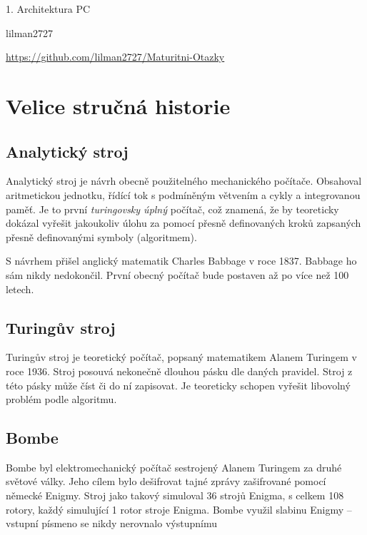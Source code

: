 \documentclass[a4paper]{article}
\begin{document}
\thispagestyle{empty}
\begin{center}
    \vspace*{5cm}
    {\huge{1. Architektura PC}} \par
    \vspace{15cm}
    {\large{lilman2727}} \par
    \vspace{3cm}
    {\url{https://github.com/lilman2727/Maturitni-Otazky}}
\end{center}


\newpage
\thispagestyle{empty}
\tableofcontents
\newpage

\section{Velice stručná historie}
    \subsection{Analytický stroj}
        Analytický stroj je návrh obecně použitelného mechanického počítače. Obsahoval aritmetickou jednotku, řídící tok s podmíněným větvením a cykly a integrovanou paměť. Je to první \textit{turingovsky úplný} počítač, což znamená, že by teoreticky dokázal vyřešit jakoukoliv úlohu za pomocí přesně definovaných kroků zapsaných přesně definovanými symboly (algoritmem).\par
        S návrhem přišel anglický matematik Charles Babbage v roce 1837. Babbage ho sám nikdy nedokončil. První obecný počítač bude postaven až po více než 100 letech.

    \subsection{Turingův stroj}
        Turingův stroj je teoretický počítač, popsaný matematikem Alanem Turingem v roce 1936. Stroj posouvá nekonečně dlouhou pásku dle daných pravidel. Stroj z této pásky může číst či do ní zapisovat. Je teoreticky schopen vyřešit libovolný problém podle algoritmu.
    \subsection{Bombe}
        Bombe byl elektromechanický počítač sestrojený Alanem Turingem za druhé světové války. Jeho cílem bylo dešifrovat tajné zprávy zašifrované pomocí německé Enigmy. Stroj jako takový simuloval 36 strojů Enigma, s celkem 108 rotory, každý simulující 1 rotor stroje Enigma. Bombe využil slabinu Enigmy -- vstupní písmeno se nikdy nerovnalo výstupnímu 
\end{document}
